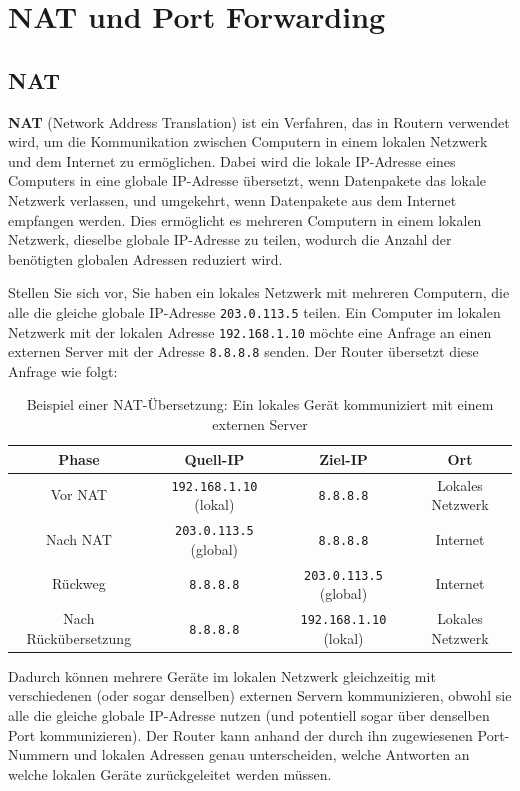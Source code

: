 
\chapter{\texorpdfstring{\gls{NAT} und Port Forwarding}{NAT und Port Forwarding}}
\label{app:nat_port_forwarding}
\section{\texorpdfstring{\acrfull{NAT}}{Network Address Translation (NAT)}}
\textbf{\gls{NAT}} (Network Address Translation) ist ein Verfahren, das in Routern verwendet wird, um die Kommunikation zwischen Computern in einem lokalen Netzwerk und dem Internet zu ermöglichen. Dabei wird die lokale \gls{IP}-Adresse eines Computers in eine globale \gls{IP}-Adresse übersetzt, wenn Datenpakete das lokale Netzwerk verlassen, und umgekehrt, wenn Datenpakete aus dem Internet empfangen werden. Dies ermöglicht es mehreren Computern in einem lokalen Netzwerk, dieselbe globale \gls{IP}-Adresse zu teilen, wodurch die Anzahl der benötigten globalen Adressen reduziert wird.

\begin{myexample}
Stellen Sie sich vor, Sie haben ein lokales Netzwerk mit mehreren Computern, die alle die gleiche globale \gls{IP}-Adresse \texttt{203.0.113.5} teilen. Ein Computer im lokalen Netzwerk mit der lokalen Adresse \texttt{192.168.1.10} möchte eine Anfrage an einen externen Server mit der Adresse \texttt{8.8.8.8} senden. Der Router übersetzt diese Anfrage wie folgt:

\begin{table}[H]
	\centering
	\begin{tabular}{c|c|c|c}
		\textbf{Phase} & \textbf{Quell-IP} & \textbf{Ziel-IP} & \textbf{Ort} \\
		\midrule\midrule
		Vor \gls{NAT} & \texttt{192.168.1.10} (lokal) & \texttt{8.8.8.8} & Lokales Netzwerk \\
		\midrule
		Nach \gls{NAT} & \texttt{203.0.113.5} (global) & \texttt{8.8.8.8} & Internet \\
		\midrule
		Rückweg & \texttt{8.8.8.8} & \texttt{203.0.113.5} (global) & Internet \\
		\midrule
		Nach Rückübersetzung & \texttt{8.8.8.8} & \texttt{192.168.1.10} (lokal) & Lokales Netzwerk \\
	\end{tabular}
	\caption{Beispiel einer \gls{NAT}-Übersetzung: Ein lokales Gerät kommuniziert mit einem externen Server}
\end{table}

Dadurch können mehrere Geräte im lokalen Netzwerk gleichzeitig mit verschiedenen (oder sogar denselben) externen Servern kommunizieren, obwohl sie alle die gleiche globale \gls{IP}-Adresse nutzen (und potentiell sogar über denselben Port kommunizieren). Der Router kann anhand der durch ihn zugewiesenen Port-Nummern und lokalen Adressen genau unterscheiden, welche Antworten an welche lokalen Geräte zurückgeleitet werden müssen.
\end{myexample}


